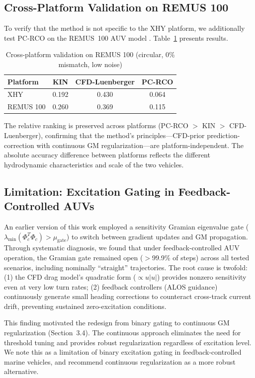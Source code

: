 

\subsection{Cross-Platform Validation on REMUS 100}

To verify that the method is not specific to the XHY platform, we additionally test PC-RCO on the REMUS~100 AUV model \cite{prestero2001development}. Table~\ref{tab:remus} presents results.

\begin{table}[h]
\centering
\caption{Cross-platform validation on REMUS 100 (circular, 0\% mismatch, low noise)}
\label{tab:remus}
\begin{tabular}{lccc}
\toprule
Platform & KIN & CFD-Luenberger & PC-RCO \\
\midrule
XHY    & 0.192 & 0.430 & 0.064 \\
REMUS 100 & 0.260 & 0.369 & 0.115 \\
\bottomrule
\end{tabular}
\end{table}

The relative ranking is preserved across platforms (PC-RCO $>$ KIN $>$ CFD-Luenberger), confirming that the method's principles---CFD-prior prediction-correction with continuous GM regularization---are platform-independent. The absolute accuracy difference between platforms reflects the different hydrodynamic characteristics and scale of the two vehicles.

\subsection{Limitation: Excitation Gating in Feedback-Controlled AUVs}

An earlier version of this work employed a sensitivity Gramian eigenvalue gate ($\lambda_{\min}(\Phi_c^T\Phi_c) > \mu_{\text{gate}}$) to switch between gradient updates and GM propagation. Through systematic diagnosis, we found that under feedback-controlled AUV operation, the Gramian gate remained open ($>$99.9\% of steps) across all tested scenarios, including nominally ``straight'' trajectories. The root cause is twofold: (1) the CFD drag model's quadratic form ($\propto u|u|$) provides nonzero sensitivity even at very low turn rates; (2) feedback controllers (ALOS guidance) continuously generate small heading corrections to counteract cross-track current drift, preventing sustained zero-excitation conditions.

This finding motivated the redesign from binary gating to continuous GM regularization (Section~3.4). The continuous approach eliminates the need for threshold tuning and provides robust regularization regardless of excitation level. We note this as a limitation of binary excitation gating in feedback-controlled marine vehicles, and recommend continuous regularization as a more robust alternative.
